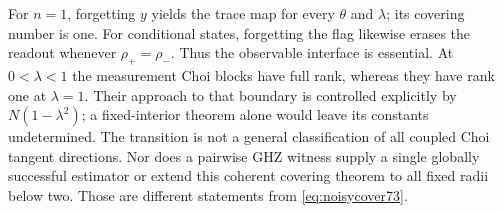 \begin{remark}\label{rem:noisyscope73}
For $n=1$, forgetting $y$ yields the trace map for every $\theta$ and
$\lambda$; its covering number is one. For conditional states, forgetting
the flag likewise erases the readout whenever $\rho_+=\rho_-$.
Thus the observable interface is essential. At $0<\lambda<1$ the
measurement Choi blocks have full rank, whereas they have rank one at
$\lambda=1$. Their approach to that boundary is controlled explicitly
by $N(1-\lambda^2)$; a fixed-interior theorem alone would leave its
constants undetermined. The transition is not a general classification
of all coupled Choi tangent directions. Nor does a pairwise GHZ witness
supply a single globally successful estimator or extend this coherent
covering theorem to all fixed radii below two. Those are different
statements from \eqref{eq:noisycover73}.
\end{remark}
